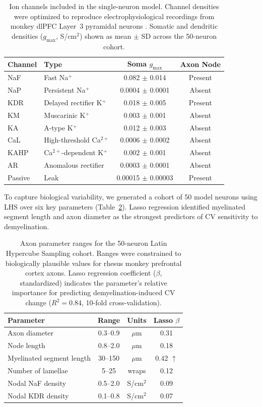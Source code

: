 \documentclass[11pt]{article}
\begin{document}
\begin{table}[H]
\centering
\caption{Ion channels included in the single-neuron model. Channel densities were optimized to reproduce electrophysiological recordings from monkey dlPFC Layer~3 pyramidal neurons \citep{rumbell2016}. Somatic and dendritic densities ($g_{\mathrm{max}}$, S/cm$^2$) shown as mean $\pm$ SD across the 50-neuron cohort.}
\label{tab:ion_channels}
\begin{tabular}{llcc}
\toprule
\textbf{Channel} & \textbf{Type} & \textbf{Soma $g_{\mathrm{max}}$} & \textbf{Axon Node} \\
\midrule
NaF & Fast Na$^+$ & 0.082 $\pm$ 0.014 & Present \\
NaP & Persistent Na$^+$ & 0.0004 $\pm$ 0.0001 & Absent \\
KDR & Delayed rectifier K$^+$ & 0.018 $\pm$ 0.005 & Present \\
KM & Muscarinic K$^+$ & 0.003 $\pm$ 0.001 & Absent \\
KA & A-type K$^+$ & 0.012 $\pm$ 0.003 & Absent \\
CaL & High-threshold Ca$^{2+}$ & 0.0006 $\pm$ 0.0002 & Absent \\
KAHP & Ca$^{2+}$-dependent K$^+$ & 0.002 $\pm$ 0.001 & Absent \\
AR & Anomalous rectifier & 0.0003 $\pm$ 0.0001 & Absent \\
Passive & Leak & 0.00015 $\pm$ 0.00003 & Present \\
\bottomrule
\end{tabular}
\end{table}

To capture biological variability, we generated a cohort of 50 model neurons using LHS over six key parameters (Table~\ref{tab:lhs_params}). Lasso regression \citep{tibshirani1996} identified myelinated segment length and axon diameter as the strongest predictors of CV sensitivity to demyelination.

\begin{table}[H]
\centering
\caption{Axon parameter ranges for the 50-neuron Latin Hypercube Sampling cohort. Ranges were constrained to biologically plausible values for rhesus monkey prefrontal cortex axons. Lasso regression coefficient ($\beta$, standardized) indicates the parameter's relative importance for predicting demyelination-induced CV change ($R^2 = 0.84$, 10-fold cross-validation).}
\label{tab:lhs_params}
\begin{tabular}{lccc}
\toprule
\textbf{Parameter} & \textbf{Range} & \textbf{Units} & \textbf{Lasso $\beta$} \\
\midrule
Axon diameter & 0.3--0.9 & $\mu$m & 0.31 \\
Node length & 0.8--2.0 & $\mu$m & 0.18 \\
Myelinated segment length & 30--150 & $\mu$m & $\mathbf{0.42}$ $\uparrow$ \\
Number of lamellae & 5--25 & wraps & 0.12 \\
Nodal NaF density & 0.5--2.0 & S/cm$^2$ & 0.09 \\
Nodal KDR density & 0.1--0.8 & S/cm$^2$ & 0.07 \\
\bottomrule
\end{tabular}
\end{table}
\end{document}
